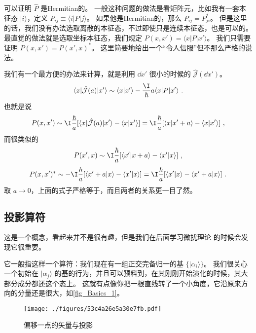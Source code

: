 \begin{example}{}
可以证明 $\hat{P}$ 是Hermitian的。 一般这种问题的做法是看矩阵元，比如我有一套本征态 $|i\rangle$，定义 $P_{ij} \equiv \langle i|P|j\rangle$。 如果他是Hermitian的，那么 $P_{ij} = P_{ji}^*$。 但是这里的话，我们没有办法选取离散的本征态，不过即使只是连续本征态，也是可以的。 最直觉的做法就是选取坐标本征态，我们规定 $P(x,x') = \langle x|P|x'\rangle$。 我们只需要证明 $P(x,x') = P(x',x)^*$。 这里简要地给出一个“令人信服”但不那么严格的说法。

我们有一个最方便的办法来计算，就是利用 $\dd{x'}$ 很小的时候的 $\hat{\mathcal{J}}(\dd{x'})$。
\begin{equation}
\langle x|\hat{\mathcal{J}}(a)|x'\rangle \sim \langle x|x'\rangle - \frac{\I}{\hbar} a \langle x|P|x'\rangle~.
\end{equation}
也就是说
\begin{equation}
P(x,x') \sim \I\frac{\hbar}{a}[\langle x|\hat{\mathcal{J}}(a)|x'\rangle - \langle x|x'\rangle] = \I\frac{\hbar}{a}[\langle x|x'+a\rangle - \langle x|x'\rangle]~,
\end{equation}
而很类似的
\begin{equation}
P(x',x) \sim \I\frac{\hbar}{a}[\langle x'|x+a\rangle - \langle x'|x\rangle]~,
\end{equation}
\begin{equation}
P(x,x')^* \sim -\I\frac{\hbar}{a} [\langle x'+a|x\rangle - \langle x'|x\rangle] = \I\frac{\hbar}{a} [\langle x'|x\rangle - \langle x'+a|x\rangle]~.
\end{equation}
取 $a\rightarrow0$，上面的式子严格等于，而且两者的关系更一目了然。
\end{example}

\subsection{投影算符}

这是一个概念，看起来并不是很有趣，但是我们在后面学习微扰理论%
的时候会发现它很重要。

它一般指这样一个算符：我们现在有一组正交完备归一的基 $\{|\alpha_i\rangle\}$。 我们很关心一个初始在 $|\alpha_j\rangle$ 的基的行为，并且可以预料到，在其刚刚开始演化的时候，其大部分成分都还这个态上。 这就有点像你把一根直线转了一个小角度，它沿原来方向的分量还是很大，如\autoref{fig_Basics_1}。

\begin{figure}[ht]
\centering
\texttt{[image: ./figures/53c4a26e5a30e7fb.pdf]}
\caption{偏移一点的矢量与投影} \label{fig_Basics_1}
\end{figure}

